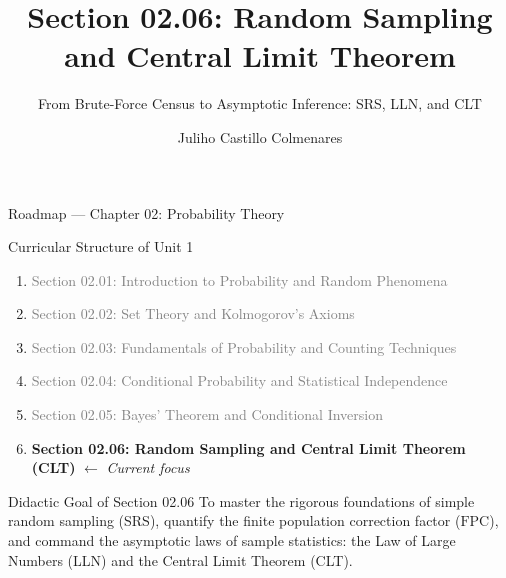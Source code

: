 \documentclass[10pt, aspectratio=169]{beamer}
\title[Random Sampling and CLT]{Section 02.06: Random Sampling and Central Limit Theorem}
\subtitle{From Brute-Force Census to Asymptotic Inference: SRS, LLN, and CLT}
\author[J. Castillo Colmenares]{Juliho Castillo Colmenares}
\institute{Tecnológico de Monterrey}
\date{\vspace{-2.0cm}}
\begin{document}
\begin{frame}[plain]
  \vspace{-0.5cm}
  \titlepage
\end{frame}

\begin{frame}{Roadmap --- Chapter 02: Probability Theory}
  \begin{block}{Curricular Structure of Unit 1}
    \footnotesize
    \begin{enumerate}\itemsep=0.08cm
      \item \textcolor{gray}{Section 02.01: Introduction to Probability and Random Phenomena}
      \item \textcolor{gray}{Section 02.02: Set Theory and Kolmogorov's Axioms}
      \item \textcolor{gray}{Section 02.03: Fundamentals of Probability and Counting Techniques}
      \item \textcolor{gray}{Section 02.04: Conditional Probability and Statistical Independence}
      \item \textcolor{gray}{Section 02.05: Bayes' Theorem and Conditional Inversion}
      \item \textbf{\textcolor{TecRojo}{Section 02.06: Random Sampling and Central Limit Theorem (CLT)}} $\leftarrow$ \emph{Current focus}
    \end{enumerate}
  \end{block}
  \vspace{-0.05cm}
  \pause
  \begin{alertblock}{Didactic Goal of Section 02.06}
    \footnotesize
    To master the rigorous foundations of simple random sampling (SRS), quantify the finite population correction factor ($\text{FPC}$), and command the asymptotic laws of sample statistics: the Law of Large Numbers (LLN) and the Central Limit Theorem (CLT).
  \end{alertblock}
\end{frame}
\end{document}
